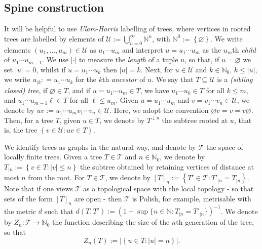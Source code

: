 \documentclass[12pt]{article}
\theoremstyle{definition}
\begin{document}
\subsection{Spine construction}
 It will be helpful to use \emph{Ulam-Harris} labelling of trees, where vertices in rooted trees are labelled by elements of $\mathcal{U}:= \bigcup_{n=0}^{\infty} \mathbb{N}^{n}$, with $\mathbb{N}^{0} := \left\{\varnothing\right\}$. We write elements $(u_1, \ldots, u_{m}) \in \mathcal{U}$ as $u_1 \cdots u_{m}$ and interpret $u = u_1 \cdots u_m$ as the $u_{m}$th \emph{child} of $u_1 \cdots u_{m-1}$. We use $|\cdot|$ to measure the \emph{length} of a tuple $u$, so that, if $u = \varnothing$ we set $|u| = 0$, whilst if $u = u_{1} \cdots u_{k}$ then $|u| = k$. Next, for $u \in \mathcal{U}$ and $k \in \mathbb{N}_0$, $k \leq |u|$, we write $u_{|k} : = u_1 \cdots u_{k}$ for the $k$th \emph{ancestor} of $u$. We say that $T \subseteq \mathcal{U}$ is a \emph{(sibling closed) tree}, if $\varnothing \in T$, and if $u = u_1 \cdots u_{m} \in T$, we have $u_{1} \cdots u_{k} \in T$ for all $k \leq m$, and $u_{1} \cdots u_{m-1} \ell \in T$ for all $\ell \leq u_{m}$. Given $u = u_1 \cdots u_m$ and $v = v_1 \cdots v_n\in \mathcal{U}$, we denote by $uv:= u_1 \cdots u_m v_1 \cdots v_n \in \mathcal{U}$. Here, we adopt the convention $\varnothing v = v = v \varnothing$. Then, for a tree $T$, given $u \in T$, we denote by $T^{\downarrow u}$ the subtree rooted at $u$, that is, the tree $\left\{v \in \mathcal{U}\colon uv \in T\right\}$. 

We identify trees as graphs in the natural way, and denote by $\mathscr{T}$ the space of locally finite trees. Given a tree $T \in \mathscr{T}$ and $n \in \mathbb{N}_{0}$, we denote by $T_{|n}:= \left\{v \in T\colon |v| \leq n\right\}$ the subtree obtained by retaining vertices of distance at most $n$ from the root. For $T \in \mathscr{T}$, we denote by $[T]_{n} := \left\{T' \in \mathscr{T}\colon T'_{|n} = T_{|n}\right\}$. Note that if one views $\mathscr{T}$ as a topological space with the local topology - so that sets of the form $[T]_{n}$ are open - then $\mathscr{T}$ is Polish, for example, metrisable with the metric $d$ such that $d(T,T') := \left(1 + \sup\{n \in \mathbb{N}\colon T_{|n} = T'_{|n} \}\right)^{-1}$.
We denote by $Z_{n}\colon \mathscr{T} \rightarrow \mathbb{N}_0$ the function describing the size of the $n$th generation of the tree, so that
\[Z_{n}(T):= |\left\{u \in T\colon |u|=n \right\}|.\]
\end{document}

